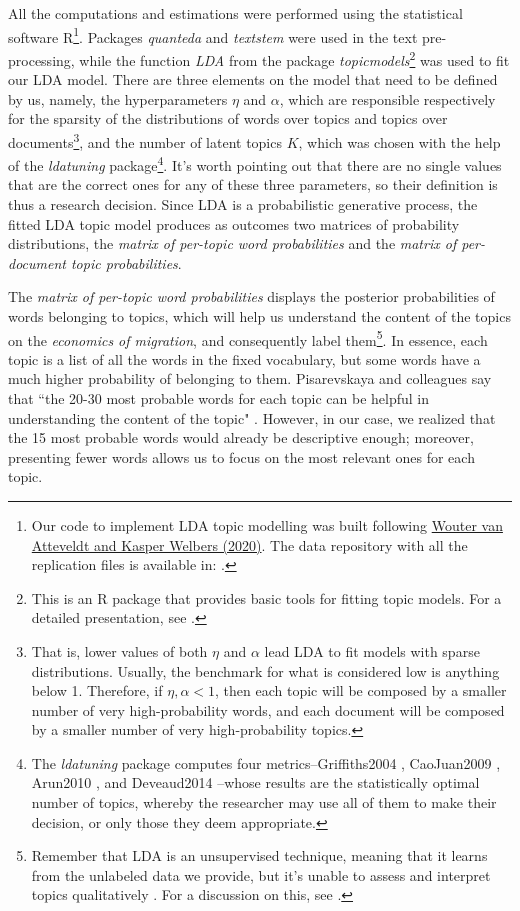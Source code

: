 All the computations and estimations were performed using the statistical software R\footnote{Our code to implement LDA topic modelling was built following \href{https://github.com/ccs-amsterdam/r-course-material/blob/master/tutorials/r_text_lda.md}{Wouter van Atteveldt and Kasper Welbers (2020)}. The data repository with all the replication files is available in: .}. Packages \textit{quanteda} and \textit{textstem} were used in the text pre-processing, while the function \textit{LDA} from the package \textit{topicmodels}\footnote{This is an R package that provides basic tools for fitting topic models. For a detailed presentation, see \cite{grun_topicmodels_2011}.} was used to fit our LDA model. There are three elements on the model that need to be defined by us, namely, the hyperparameters $\eta$ and $\alpha$, which are responsible respectively for the sparsity of the distributions of words over topics and topics over documents\footnote{That is, lower values of both $\eta$ and $\alpha$ lead LDA to fit models with sparse distributions. Usually, the benchmark for what is considered low is anything below 1. Therefore, if $\eta, \alpha < 1$, then each topic will be composed by a smaller number of very high-probability words, and each document will be composed by a smaller number of very high-probability topics.}, and the number of latent topics $K$, which was chosen with the help of the \textit{ldatuning} package\footnote{The \textit{ldatuning} package computes four metrics--Griffiths2004 \citep{griffiths_finding_2004}, CaoJuan2009 \citep{cao_density-based_2009}, Arun2010 \citep{arun_finding_2010}, and Deveaud2014 \citep{deveaud_accurate_2014}--whose results are the statistically optimal number of topics, whereby the researcher may use all of them to make their decision, or only those they deem appropriate.}. It's worth pointing out that there are no single values that are the correct ones for any of these three parameters, so their definition is thus a research decision. Since LDA is a probabilistic generative process, the fitted LDA topic model produces as outcomes two matrices of probability distributions, the \textit {matrix of per-topic word probabilities} and the \textit{matrix of per-document topic probabilities}. 

The \textit{matrix of per-topic word probabilities} displays the posterior probabilities of words belonging to topics, which will help us understand the content of the topics on the \textit{economics of migration}, and consequently label them\footnote{Remember that LDA is an unsupervised technique, meaning that it learns from the unlabeled data we provide, but it's unable to assess and interpret topics qualitatively \citep{evans_machine_2016}. For a discussion on this, see \cite{chang_reading_2009}.}. In essence, each topic is a list of all the words in the fixed vocabulary, but some words have a much higher probability of belonging to them. Pisarevskaya and colleagues say that ``the 20-30 most probable words for each topic can be helpful in understanding the content of the topic" \citep[p. 460]{pisarevskaya_mapping_2020}. However, in our case, we realized that the 15 most probable words would already be descriptive enough; moreover, presenting fewer words allows us to focus on the most relevant ones for each topic.


